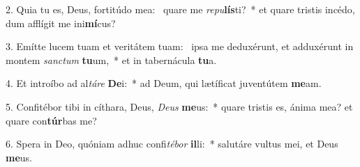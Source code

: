 2. Quia tu es, Deus, fortitúdo mea: \dag\  quare me \textit{re}\textit{pu}\textbf{lís}ti?~*  et quare tristis incédo, dum afflígit me ini\textbf{mí}cus?\

3. Emítte lucem tuam et veritátem tuam: \dag\  ipsa me deduxérunt, et adduxérunt in montem \textit{sanc}\textit{tum} \textbf{tu}um,~*  et in tabernácula \textbf{tu}a.\

4. Et introíbo ad al\textit{tá}\textit{re} \textbf{De}i:~*  ad Deum, qui lætíficat juventútem \textbf{me}am.\

5. Confitébor tibi in cíthara, Deus, \textit{De}\textit{us} \textbf{me}us:~*  quare tristis es, ánima mea? et quare con\textbf{túr}bas me?\

6. Spera in Deo, quóniam adhuc confi\textit{té}\textit{bor} \textbf{il}li:~*  salutáre vultus mei, et Deus \textbf{me}us.\

